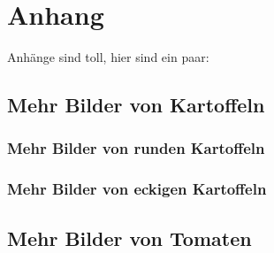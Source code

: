 \section*{Anhang}

\listofanhangselement

Anhänge sind toll, hier sind ein paar:

\subsection*{Mehr Bilder von Kartoffeln}
\blindtext

\subsubsection*{Mehr Bilder von runden Kartoffeln}
\blindtext

\subsubsection*{Mehr Bilder von eckigen Kartoffeln}
\blindtext

\subsection*{Mehr Bilder von Tomaten}
\blindtext